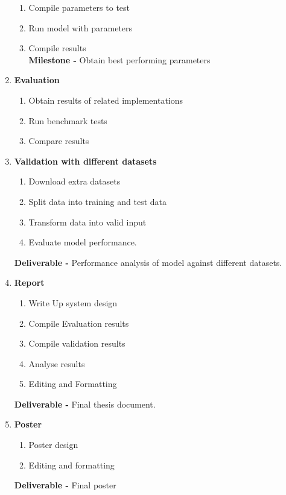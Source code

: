 \begin{enumerate}
    	\begin{enumerate}
    		\item Compile parameters to test
    		\item Run model with parameters
    		\item Compile results \\ 
    		\textbf{Milestone -} Obtain best performing parameters
    	\end{enumerate}
    \item \textbf{Evaluation} 
    	\begin{enumerate}
    		\item Obtain results of related implementations 
    		\item Run benchmark tests
    		\item Compare results
	    \end{enumerate}
    	  	
    \item \textbf{Validation with different datasets} 
    	\begin{enumerate}
    		\item Download extra datasets 
    		\item Split data into training and test data 
    		\item Transform data into valid input
    		\item Evaluate model performance.
    		
    	\end{enumerate}
    	\textbf{Deliverable -} Performance analysis of model against different datasets.
    
    \item \textbf{Report}
    	\begin{enumerate}
    		\item Write Up system design
    		\item Compile Evaluation results 
    		\item Compile validation results 
    		\item Analyse results 
    		\item Editing and Formatting
    	\end{enumerate}
    \textbf{Deliverable -} Final thesis document. 

	\item \textbf{Poster}
	\begin{enumerate}
		\item Poster design 
		\item Editing and formatting 
	\end{enumerate}
	\textbf{Deliverable - } Final poster
\end{enumerate}



